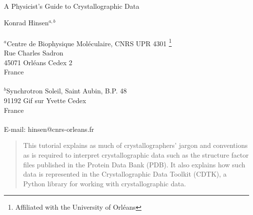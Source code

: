 \documentclass[12pt]{article}
\begin{document}
{\parindent=0mm

{\Large
A Physicist's Guide to Crystallographic Data
}

\vspace{5mm}

{\large Konrad Hinsen$^{a, b}$}\\
\\
$^a$Centre de Biophysique Mol\'eculaire, CNRS UPR 4301
\footnote{Affiliated with the University of Orl\'eans}\\
Rue Charles Sadron\\
45071 Orl\'eans Cedex 2\\
France\\
\\
$^b$Synchrotron Soleil, Saint Aubin, B.P. 48\\
91192 Gif sur Yvette Cedex\\
France\\
\\
E-mail: hinsen@cnrs-orleans.fr\\
}
\date{}

\vspace{15mm}

\begin{abstract}
  This tutorial explains as much of crystallographers' jargon and
  conventions as is required to interpret crystallographic data
  such as the structure factor files published in the Protein
  Data Bank (PDB). It also explains how such data is represented
  in the Crystallographic Data Toolkit (CDTK), a Python library for
  working with crystallographic data.
\end{abstract}
\end{document}
